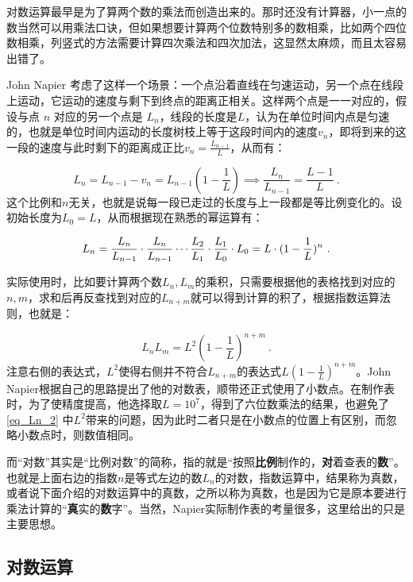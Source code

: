 对数运算最早是为了算两个数的乘法而创造出来的。那时还没有计算器，小一点的数当然可以用乘法口诀，但如果想要计算两个位数特别多的数相乘，比如两个四位数相乘，列竖式的方法需要计算四次乘法和四次加法，这显然太麻烦，而且太容易出错了。

John Napier 考虑了这样一个场景：一个点沿着直线在匀速运动，另一个点在线段上运动，它运动的速度与剩下到终点的距离正相关。这样两个点是一一对应的，假设与点 $n$ 对应的另一个点是 $L_n$，线段的长度是$L$，认为在单位时间内点是匀速的，也就是单位时间内运动的长度树枝上等于这段时间内的速度$v_n$，即将到来的这一段的速度与此时剩下的距离成正比$\displaystyle v_{n}=\frac{L_{n-1}}{L}$，从而有：

\begin{equation}
L_{n}=L_{n-1}-v_{n}=L_{n-1}(1-\frac{1}{L})\implies\frac{L_{n}}{L_{n-1}}= \frac{L-1}{L}~.
\end{equation}
这个比例和$n$无关，也就是说每一段已走过的长度与上一段都是等比例变化的。设初始长度为$L_{0}=L$，从而根据现在熟悉的幂运算有：

\begin{equation}\label{eq_Ln_1}
L_n={L_{n}\over L_{n-1}}\cdot{L_{n}\over L_{n-1}}\cdots{L_{2}\over L_{1}}\cdot{L_{1}\over L_{0}}\cdot L_0=L\cdot(1 - \frac{1}{L})^n~.
\end{equation}

实际使用时，比如要计算两个数$L_n,L_m$的乘积，只需要根据他的表格找到对应的$n,m$，求和后再反查找到对应的$L_{n+m}$就可以得到计算的积了，根据指数运算法则，也就是：

\begin{equation}\label{eq_Ln_2}
L_nL_m=L^2(1 - \frac{1}{L})^{n+m}~.
\end{equation}
注意右侧的表达式，$L^2$使得右侧并不符合$L_{n+m}$的表达式$\displaystyle L(1 - \frac{1}{L})^{n+m}$。John Napier根据自己的思路提出了他的对数表，顺带还正式使用了小数点。在制作表时，为了使精度提高，他选择取$L=10^7$，得到了六位数乘法的结果，也避免了\autoref{eq_Ln_2} 中$L^2$带来的问题，因为此时二者只是在小数点的位置上有区别，而忽略小数点时，则数值相同。

而“对数”其实是“比例对数”的简称，指的就是“按照\textbf{比例}制作的，\textbf{对}着查表的\textbf{数}”。也就是上面右边的指数$n$是等式左边的数$L_n$的对数，指数运算中，结果称为真数，或者说下面介绍的对数运算中的真数，之所以称为真数，也是因为它是原本要进行乘法计算的“\textbf{真}实的\textbf{数}字”。当然，Napier实际制作表的考量很多，这里给出的只是主要思想。

\subsection{对数运算}

